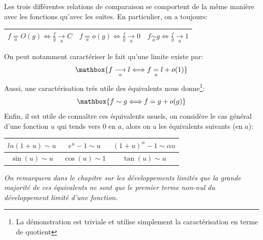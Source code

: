 \subsection*{}

Les trois différentes relations de comparaison se comportent de la même manière avec les fonctions qu'avec les suites. En particulier, on a toujours:
\begin{center}
   \renewcommand{\arraystretch}{1.5}%
   \begin{tabular}{| c | c | c |}
   \hline
   \(f \underset{a}{=} O(g) \Longleftrightarrow \frac{f}{g} \underset{a}{\longrightarrow} C\) &    \(f \underset{a}{=} o(g) \Longleftrightarrow \frac{f}{g} \underset{a}{\longrightarrow} 0\) &    \(f \underset{a}{\sim} g \Longleftrightarrow \frac{f}{g} \underset{a}{\longrightarrow} 1\)\\ [1.5ex]
   \hline
   \end{tabular}
\end{center}  
On peut notamment caractériser le fait qu'une limite existe par:
\[
   \mathbox{f \underset{a}{\longrightarrow} l \Longleftrightarrow f \underset{a}{=} l + o(1)}
\] 
Aussi, une caractérisation trés utile des équivalents nous donne\footnote[2]{La démonstration est triviale et utilise simplement la caractérisation en terme de quotient}:
\[
   \mathbox{f \sim g \Longleftrightarrow f = g + o(g)}
\] 
Enfin, il est utile de connaître ces équivalents usuels, on considère le cas général d'une fonction \(u\) qui tends vers 0 en \(a\), alors on a les équivalents suivants (en \(a\)):

\begin{center}
   \renewcommand{\arraystretch}{1.5}%
   \begin{tabular}{| c | c | c |}
   \hline
   \(ln(1 + u) \sim u\) & \(e^u - 1 \sim u\) & \((1 + u)^\alpha - 1 \sim \alpha u\)\\ [0.5ex]
   \hline
   \(\sin(u) \sim u\) & \(\cos(u) \sim 1\) & \(\tan(u) \sim u\)\\ [0.5ex]
   \hline
   \end{tabular}
\end{center} 
\begin{center}
   \textit{
      On remarquera dans le chapitre sur les développements limités que la grande majorité de ces équivalents ne sont que le premier terme non-nul du développement limité d'une fonction.
   }
\end{center}

